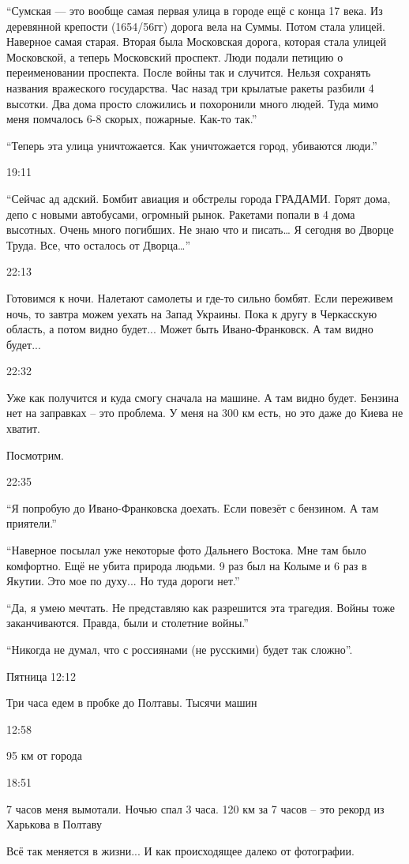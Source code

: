 \enquote{Сумская — это вообще самая первая улица в городе ещё с конца 17 века. Из
деревянной крепости (1654/56гг) дорога вела на Суммы. Потом стала улицей.
Наверное самая старая. Вторая была Московская дорога, которая стала улицей
Московской, а теперь Московский проспект. Люди подали петицию о переименовании
проспекта. После войны так и случится. Нельзя сохранять названия вражеского
государства. Час назад три крылатые ракеты разбили 4 высотки. Два дома просто
сложились и похоронили много людей. Туда мимо меня помчалось 6-8 скорых,
пожарные. Как-то так.}

\enquote{Теперь эта улица уничтожается. Как уничтожается город, убиваются люди.}

19:11

\enquote{Сейчас ад адский. Бомбит авиация и обстрелы города ГРАДАМИ. Горят дома, депо с
новыми автобусами, огромный рынок. Ракетами попали в 4 дома высотных. Очень
много погибших. Не знаю что и писать… Я сегодня во Дворце Труда. Все, что
осталось от Дворца…}

22:13

Готовимся к ночи. Налетают самолеты и где-то сильно бомбят. Если переживем
ночь, то завтра можем уехать на Запад Украины. Пока к другу в Черкасскую
область, а потом видно будет... Может быть Ивано-Франковск. А там видно будет...

22:32

Уже как получится и куда смогу сначала на машине. А там видно будет. Бензина
нет на заправках – это проблема. У меня на 300 км есть, но это даже до Киева не
хватит.

Посмотрим.

22:35

\enquote{Я попробую до Ивано-Франковска доехать. Если повезёт с бензином. А там приятели.}

\enquote{Наверное посылал уже некоторые фото Дальнего Востока. Мне там было комфортно.
Ещё не убита природа людьми. 9 раз был на Колыме и 6 раз в Якутии. Это мое по
духу... Но туда дороги нет.}

\enquote{Да, я умею мечтать. Не представляю как разрешится эта трагедия. Войны
тоже заканчиваются. Правда, были и столетние войны.}

\enquote{Никогда не думал, что с россиянами (не русскими) будет так сложно}.

Пятница 12:12

Три часа едем в пробке до Полтавы. Тысячи машин

12:58

95 км от города

18:51

7 часов меня вымотали. Ночью спал 3 часа. 120 км за 7 часов – это рекорд из
Харькова в Полтаву

Всё так меняется в жизни... И как происходящее далеко от фотографии.
